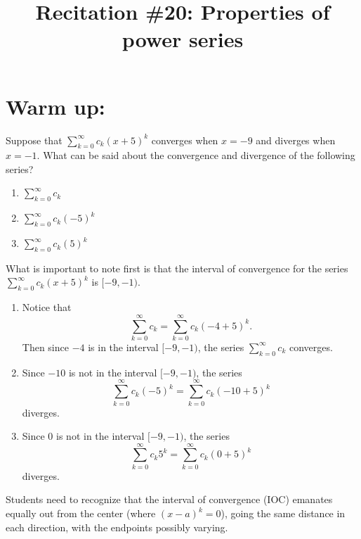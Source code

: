 \documentclass[noinstructornotes]{ximera}
\title{Recitation \#20: Properties of power series}
\begin{document}
\begin{abstract}		\end{abstract}
\maketitle



\section{Warm up:}
Suppose that $\sum_{k=0}^\infty c_k (x+5)^k$ converges when $x=-9$ and diverges when $x=-1$.  
What can be said about the convergence and divergence of the following series?
	\begin{multicols}{3}
	\begin{enumerate}
	\item  $\sum_{k=0}^\infty c_k$
	\item  $\sum_{k=0}^\infty c_k (-5)^k$
	\item  $\sum_{k=0}^\infty c_k (5)^k$
	\end{enumerate}
	\end{multicols}
	
	\begin{freeResponse}
	 What is important to note first is that the interval of convergence for the series $\sum_{k=0}^\infty c_k (x+5)^k$ is $[-9,-1)$. 
	
	\begin{enumerate}
	\item  Notice that
		\[
		\sum_{k=0}^\infty c_k = \sum_{k=0}^\infty c_k (-4+5)^k.
		\]
	Then since $-4$ is in the interval $[-9,-1)$, the series $\sum_{k=0}^\infty c_k$ converges.
	
	\item  Since $-10$ is not in the interval $[-9,-1)$, the series
		\[
		 \sum_{k=0}^\infty c_k (-5)^k = \sum_{k=0}^\infty c_k (-10+5)^k
		\]
	diverges.
	
	\item  Since $0$ is not in the interval $[-9,-1)$, the series
		\[
		\sum_{k=0}^\infty c_k 5^k = \sum_{k=0}^\infty c_k (0+5)^k
		\]
	diverges.
	\end{enumerate}
	\end{freeResponse}
	
\begin{instructorNotes}
Students need to recognize that the interval of convergence (IOC) emanates equally out from the center (where $(x-a)^k = 0$), going the same distance in each direction, with the endpoints possibly varying.
\end{instructorNotes}
\end{document}

